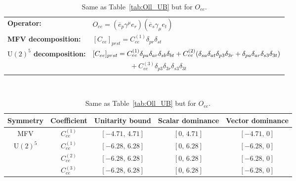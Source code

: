 \begin{table}[tbp]
\centering
{\small
\begin{tabular}{ll}
    \textbf{Operator:} &
        $\boxed{O_{ee} = (\overline e_p \gamma^\mu e_r)(\overline e_s \gamma_\mu e_t)}$ \\[0.2cm]
    \textbf{MFV decomposition:} &
        $[C_{ee}]_{prst} = C_{ee}^{(1)}\delta_{pr}\delta_{st}$ \\[0.15cm]
    \textbf{$\mathrm{U}(2)^5$ decomposition:} &
        $[C_{ee}]_{prst} =
            C_{ee}^{(1)}\Pij{p}{r}{a}\Pij{s}{t}{b}
            + C_{ee}^{(2)}(\Pij{s}{t}{a}\delta_{p3}\delta_{3r} + \Pij{p}{r}{a}\delta_{s3}\delta_{3t})$ \\
        & $\phantom{[C_{ee}]_{prst} ={}}+ C_{ee}^{(3)}\delta_{p3}\delta_{3r}\delta_{s3}\delta_{3t}$ \\
\end{tabular}
\\[0.3cm]
\renewcommand{\arraystretch}{1.3}
\begin{tabular}{ccccc}
    \toprule
    \rowcolor{hdrcolor}
    \textbf{Symmetry} & \textbf{Coefficient}
        & \textbf{Unitarity bound}
        & \textbf{Scalar dominance}
        & \textbf{Vector dominance} \\
    \midrule
    \multirow{1}{*}{MFV}
        & $C_{ee}^{(1)}$ & $[-4.71,\, 4.71]$ & $[0,\, 4.71]$ & $[-4.71,\, 0]$ \\
    \midrule
    \multirow{3}{*}{$\mathrm{U}(2)^5$}
        & $C_{ee}^{(1)}$ & $[-6.28,\, 6.28]$ & $[0,\, 6.28]$ & $[-6.28,\, 0]$ \\
        & $C_{ee}^{(2)}$ & $[-6.28,\, 6.28]$ & $[0,\, 6.28]$ & $[-6.28,\, 0]$ \\
        & $C_{ee}^{(3)}$ & $[-6.28,\, 6.28]$ & $[0,\, 6.28]$ & $[-6.28,\, 0]$ \\
    \bottomrule
\end{tabular}}
\caption{Same as Table~\ref{tab:Oll_UB} but for $O_{ee}$.}
\label{tab:Oee_UB}
\end{table}

